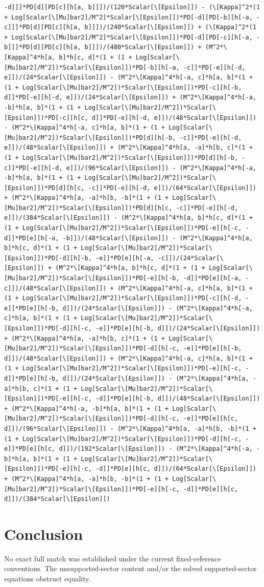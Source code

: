 \documentclass[11pt]{article}
\begin{document}
\begin{verbatim}
-d]]]*PD[d][PD[c][h[a, b]]])/(120*Scalar[\[Epsilon]]) - (\[Kappa]^2*(1 + Log[Scalar[\[Mu]bar2]/M^2]*Scalar[\[Epsilon]])*PD[-d][PD[-b][h[-a, -c]]]*PD[d][PD[c][h[a, b]]])/(240*Scalar[\[Epsilon]]) + (\[Kappa]^2*(1 + Log[Scalar[\[Mu]bar2]/M^2]*Scalar[\[Epsilon]])*PD[-d][PD[-c][h[-a, -b]]]*PD[d][PD[c][h[a, b]]])/(480*Scalar[\[Epsilon]]) + (M^2*\[Kappa]^4*h[a, b]*h[c, d]*(1 + (1 + Log[Scalar[\[Mu]bar2]/M^2])*Scalar[\[Epsilon]])*PD[-b][h[-a, -c]]*PD[-e][h[-d, e]])/(24*Scalar[\[Epsilon]]) - (M^2*\[Kappa]^4*h[-a, c]*h[a, b]*(1 + (1 + Log[Scalar[\[Mu]bar2]/M^2])*Scalar[\[Epsilon]])*PD[-c][h[-b, d]]*PD[-e][h[-d, e]])/(24*Scalar[\[Epsilon]]) + (M^2*\[Kappa]^4*h[-a, -b]*h[a, b]*(1 + (1 + Log[Scalar[\[Mu]bar2]/M^2])*Scalar[\[Epsilon]])*PD[-c][h[c, d]]*PD[-e][h[-d, e]])/(48*Scalar[\[Epsilon]]) - (M^2*\[Kappa]^4*h[-a, c]*h[a, b]*(1 + (1 + Log[Scalar[\[Mu]bar2]/M^2])*Scalar[\[Epsilon]])*PD[d][h[-b, -c]]*PD[-e][h[-d, e]])/(48*Scalar[\[Epsilon]]) + (M^2*\[Kappa]^4*h[a, -a]*h[b, c]*(1 + (1 + Log[Scalar[\[Mu]bar2]/M^2])*Scalar[\[Epsilon]])*PD[d][h[-b, -c]]*PD[-e][h[-d, e]])/(96*Scalar[\[Epsilon]]) - (M^2*\[Kappa]^4*h[-a, -b]*h[a, b]*(1 + (1 + Log[Scalar[\[Mu]bar2]/M^2])*Scalar[\[Epsilon]])*PD[d][h[c, -c]]*PD[-e][h[-d, e]])/(64*Scalar[\[Epsilon]]) + (M^2*\[Kappa]^4*h[a, -a]*h[b, -b]*(1 + (1 + Log[Scalar[\[Mu]bar2]/M^2])*Scalar[\[Epsilon]])*PD[d][h[c, -c]]*PD[-e][h[-d, e]])/(384*Scalar[\[Epsilon]]) - (M^2*\[Kappa]^4*h[a, b]*h[c, d]*(1 + (1 + Log[Scalar[\[Mu]bar2]/M^2])*Scalar[\[Epsilon]])*PD[-e][h[-c, -d]]*PD[e][h[-a, -b]])/(48*Scalar[\[Epsilon]]) - (M^2*\[Kappa]^4*h[a, b]*h[c, d]*(1 + (1 + Log[Scalar[\[Mu]bar2]/M^2])*Scalar[\[Epsilon]])*PD[-d][h[-b, -e]]*PD[e][h[-a, -c]])/(24*Scalar[\[Epsilon]]) + (M^2*\[Kappa]^4*h[a, b]*h[c, d]*(1 + (1 + Log[Scalar[\[Mu]bar2]/M^2])*Scalar[\[Epsilon]])*PD[-e][h[-b, -d]]*PD[e][h[-a, -c]])/(48*Scalar[\[Epsilon]]) + (M^2*\[Kappa]^4*h[-a, c]*h[a, b]*(1 + (1 + Log[Scalar[\[Mu]bar2]/M^2])*Scalar[\[Epsilon]])*PD[-c][h[-d, -e]]*PD[e][h[-b, d]])/(24*Scalar[\[Epsilon]]) - (M^2*\[Kappa]^4*h[-a, c]*h[a, b]*(1 + (1 + Log[Scalar[\[Mu]bar2]/M^2])*Scalar[\[Epsilon]])*PD[-d][h[-c, -e]]*PD[e][h[-b, d]])/(24*Scalar[\[Epsilon]]) + (M^2*\[Kappa]^4*h[a, -a]*h[b, c]*(1 + (1 + Log[Scalar[\[Mu]bar2]/M^2])*Scalar[\[Epsilon]])*PD[-d][h[-c, -e]]*PD[e][h[-b, d]])/(48*Scalar[\[Epsilon]]) + (M^2*\[Kappa]^4*h[-a, c]*h[a, b]*(1 + (1 + Log[Scalar[\[Mu]bar2]/M^2])*Scalar[\[Epsilon]])*PD[-e][h[-c, -d]]*PD[e][h[-b, d]])/(24*Scalar[\[Epsilon]]) - (M^2*\[Kappa]^4*h[a, -a]*h[b, c]*(1 + (1 + Log[Scalar[\[Mu]bar2]/M^2])*Scalar[\[Epsilon]])*PD[-e][h[-c, -d]]*PD[e][h[-b, d]])/(48*Scalar[\[Epsilon]]) + (M^2*\[Kappa]^4*h[-a, -b]*h[a, b]*(1 + (1 + Log[Scalar[\[Mu]bar2]/M^2])*Scalar[\[Epsilon]])*PD[-d][h[-c, -e]]*PD[e][h[c, d]])/(96*Scalar[\[Epsilon]]) - (M^2*\[Kappa]^4*h[a, -a]*h[b, -b]*(1 + (1 + Log[Scalar[\[Mu]bar2]/M^2])*Scalar[\[Epsilon]])*PD[-d][h[-c, -e]]*PD[e][h[c, d]])/(192*Scalar[\[Epsilon]]) - (M^2*\[Kappa]^4*h[-a, -b]*h[a, b]*(1 + (1 + Log[Scalar[\[Mu]bar2]/M^2])*Scalar[\[Epsilon]])*PD[-e][h[-c, -d]]*PD[e][h[c, d]])/(64*Scalar[\[Epsilon]]) + (M^2*\[Kappa]^4*h[a, -a]*h[b, -b]*(1 + (1 + Log[Scalar[\[Mu]bar2]/M^2])*Scalar[\[Epsilon]])*PD[-e][h[-c, -d]]*PD[e][h[c, d]])/(384*Scalar[\[Epsilon]])
\end{verbatim}
\section{Conclusion}
No exact full match was established under the current fixed-reference conventions. The unsupported-sector content and/or the solved supported-sector equations obstruct equality.
\end{document}
